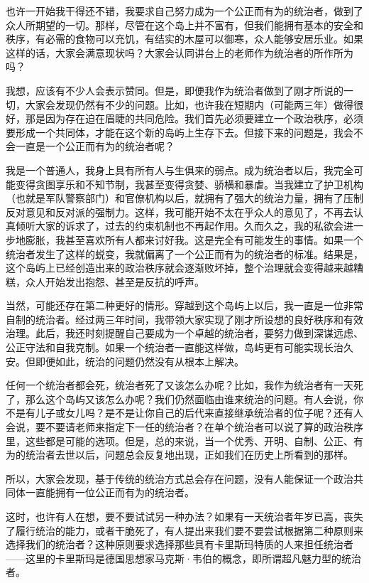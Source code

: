 也许一开始我干得还不错，我要求自己努力成为一个公正而有为的统治者，做到了众人所期望的一切。那样，尽管在这个岛上并不富有，但我们能拥有基本的安全和秩序，有必需的食物可以充饥，有结实的木屋可以御寒，众人能够安居乐业。如果这样的话，大家会满意现状吗？大家会认同讲台上的老师作为统治者的所作所为吗？

我想，应该有不少人会表示赞同。但是，即便我作为统治者做到了刚才所说的一切，大家会发现仍然有不少的问题。比如，也许我在短期内（可能两三年）做得很好，那是因为存在迫在眉睫的共同危险。我们首先必须要建立一个政治秩序，必须要形成一个共同体，才能在这个新的岛屿上生存下去。但接下来的问题是，我会不会一直是一个公正而有为的统治者呢？

我是一个普通人，我身上具有所有人与生俱来的弱点。成为统治者以后，我完全可能变得贪图享乐和不知节制，我甚至变得贪婪、骄横和暴虐。当我建立了护卫机构（也就是军队警察部门）和官僚机构以后，就拥有了强大的统治力量，拥有了压制反对意见和反对派的强制力。这样，我可能开始不太在乎众人的意见了，不再去认真倾听大家的诉求了，过去的约束机制也不再起作用。久而久之，我的私欲会进一步地膨胀，我甚至喜欢所有人都来讨好我。这是完全有可能发生的事情。如果一个统治者发生了这样的蜕变，我就偏离了一个公正而有为的统治者的标准。结果是，这个岛屿上已经创造出来的政治秩序就会逐渐败坏掉，整个治理就会变得越来越糟糕，众人开始发出抱怨、甚至是反抗的呼声。

当然，可能还存在第二种更好的情形。穿越到这个岛屿上以后，我一直是一位非常自制的统治者。经过两三年时间，我带领大家实现了刚才所设想的良好秩序和有效治理。此后，我还时刻提醒自己要成为一个卓越的统治者，要努力做到深谋远虑、公正守法和自我克制。如果一个统治者一直能这样做，岛屿更有可能实现长治久安。但即便如此，统治的问题仍然没有从根本上解决。

任何一个统治者都会死，统治者死了又该怎么办呢？比如，我作为统治者有一天死了，那么这个岛屿又该怎么办呢？我们仍然面临由谁来统治的问题。有人会说，你不是有儿子或女儿吗？是不是让你自己的后代来直接继承统治者的位子呢？还有人会说，要不要请老师来指定下一任的统治者？在单个统治者可以说了算的政治秩序里，这些都是可能的选项。但是，总的来说，当一个优秀、开明、自制、公正、有为的统治者去世以后，问题总会反复地出现，正如我们在历史上所看到的那样。

所以，大家会发现，基于传统的统治方式总会存在问题，没有人能保证一个政治共同体一直能拥有一位公正而有为的统治者。

这时，也许有人在想，要不要试试另一种办法？如果有一天统治者年岁已高，丧失了履行统治的能力，或者干脆死了，有人提出来我们要不要尝试根据第二种原则来选择我们的统治者？这种原则要求选择那些具有卡里斯玛特质的人来担任统治者——这里的卡里斯玛是德国思想家马克斯·韦伯的概念，即所谓超凡魅力型的统治者。

